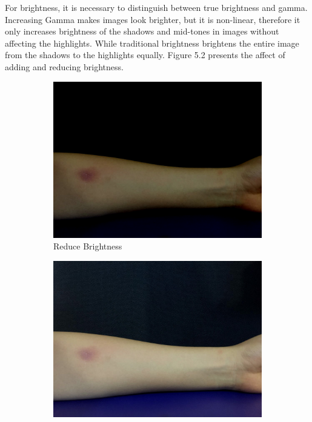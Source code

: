 \newpage
For brightness, it is necessary to distinguish between true brightness and gamma. Increasing Gamma makes images look brighter, but it is non-linear, therefore it only increases brightness of the shadows and mid-tones in images without affecting the highlights. While traditional brightness brightens the entire image from the shadows to the highlights equally. Figure 5.2 presents the affect of adding and reducing brightness.
\begin{figure}[!h]
\centering
\begin{subfigure}{.35\textwidth}
  \centering
  \includegraphics[scale=0.14]{img/bright1}
  \caption{Reduce Brightness}
  \label{fig:sub1}
\end{subfigure}%
\begin{subfigure}{.3\textwidth}
  \centering
  \includegraphics[scale=0.14]{img/original}

\end{subfigure}
\end{figure}
